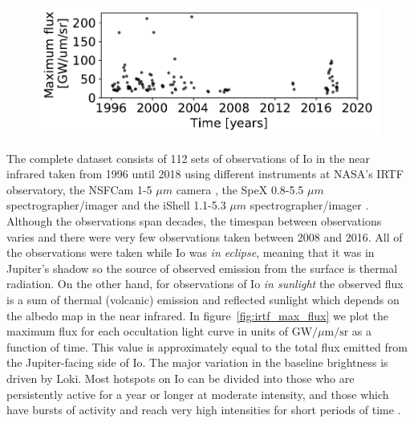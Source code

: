 \documentclass[modern]{aastex62}
\begin{document}
\begin{figure}[t!]
    \begin{centering}
    \includegraphics[width=\linewidth]{figures/irtf_max_flux.pdf}
    \end{centering}
\end{figure}

The complete dataset consists of 112 sets of observations of Io in the near infrared taken from 1996 until 2018 using different instruments at NASA's IRTF observatory, the NSFCam  1-5 $\mu m$ camera \citep{shure1994}, the SpeX 0.8-5.5 $\mu m$ spectrographer/imager \citep{rayner2003} and the iShell 1.1-5.3 $\mu m$  spectrographer/imager \citep{rayner2016}.
Although the observations span decades, the timespan between observations varies and there were very few observations taken between 2008 and 2016.
All of the observations were taken while Io was \emph{in eclipse}, meaning that it was in Jupiter's shadow so the source of observed emission from the surface is thermal radiation.
On the other hand, for observations of Io \emph{in sunlight} the observed flux is a sum of thermal (volcanic) emission and reflected sunlight which depends on the albedo map in the near infrared.
In figure~\ref{fig:irtf_max_flux} we plot the maximum flux for each occultation light curve in units of $\mathrm{GW}/\mu \mathrm{m}/\mathrm{sr}$ as a function of time.
This value is approximately equal to the total flux emitted from the Jupiter-facing side of Io.
The major variation in the baseline brightness is driven by Loki.
Most hotspots on Io can be divided into those who are persistently active for a year or longer at moderate intensity, and those which have bursts of activity and reach very high intensities for short periods of time \citep{dekleer2016}.
\end{document}
